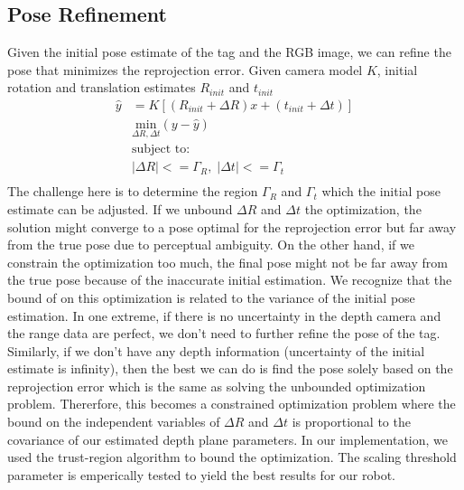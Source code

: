 \subsection{Pose Refinement}
Given the initial pose estimate of the tag and the RGB image, we can refine the pose that minimizes the reprojection error. Given camera model $K$, initial rotation and translation estimates $R_{init}$ and $t_{init}$
\begin{align*}
\hat{y} &= K[(R_{init} + \Delta R)x + (t_{init} + \Delta t)]\\
&\underset{\Delta R, \Delta t}{\mathrm{min}} (y - \hat{y})\\
&\text{subject to:} \\
& |\Delta R| <= \Gamma_R, \; |\Delta t| <= \Gamma_t\\
\end{align*}
The challenge here is to determine the region $\Gamma_R$ and $\Gamma_t$ which the initial pose estimate can be adjusted. If we unbound $\Delta R$ and $\Delta t$ the optimization, the solution might converge to a pose optimal for the reprojection error but far away from the true pose due to perceptual ambiguity. On the other hand, if we constrain the optimization too much, the final pose might not be far away from the true pose because of the inaccurate initial estimation. We recognize that the bound of on this optimization is related to the variance of the initial pose estimation. In one extreme, if there is no uncertainty in the depth camera and the range data are perfect, we don't need to further refine the pose of the tag. Similarly, if we don't have any depth information (uncertainty of the initial estimate is infinity), then the best we can do is find the pose solely based on the reprojection error which is the same as solving the unbounded optimization problem. Thererfore, this becomes a constrained optimization problem where the bound on the independent variables of $\Delta R$ and $\Delta t$ is proportional to the covariance of our estimated depth plane parameters. In our implementation, we used the trust-region algorithm to bound the optimization. The scaling threshold parameter is emperically tested to yield the best results for our robot. 